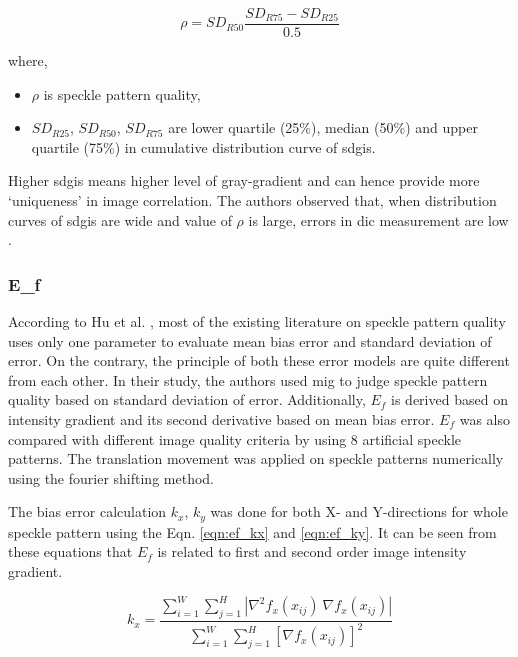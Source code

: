         \begin{equation}
            \rho = SD_{R50} \dfrac{SD_{R75} - SD_{R25}}{0.5}
        \end{equation}

        \noindent where,
        \begin{itemize}
            \item $\rho$ is speckle pattern quality,
            \item $SD_{R25}$, $SD_{R50}$, $SD_{R75}$ are lower quartile (25\%), median (50\%) and upper quartile (75\%) in cumulative distribution curve of \gls{sdgis}.
        \end{itemize}

        \noindent Higher \gls{sdgis} means higher level of gray-gradient and can hence provide more `uniqueness' in image correlation. The authors observed that, when distribution curves of \gls{sdgis} are wide and value of $\rho$ is large, errors in \gls{dic} measurement are low \cite{park_sdgis}. 

    \subsubsection{E\textbf{_f}}
        According to Hu et al. \cite{hu_ef}, most of the existing literature on speckle pattern quality uses only one parameter to evaluate mean bias error and standard deviation of error. On the contrary, the principle of both these error models are quite different from each other. In their study, the authors used \gls{mig} to judge speckle pattern quality based on standard deviation of error. Additionally, $E_f$ is derived based on intensity gradient and its second derivative based on mean bias error. $E_f$ was also compared with different image quality criteria by using 8 artificial speckle patterns. The translation movement was applied on speckle patterns numerically using the fourier shifting method. 

        \vspace{5mm}
        \noindent The bias error calculation $k_x$, $k_y$ was done for both X- and Y-directions for whole speckle pattern using the Eqn. \ref{eqn:ef_kx} and \ref{eqn:ef_ky}. It can be seen from these equations that $E_f$ is related to first and second order image intensity gradient. 
        
        \begin{equation}
            k_x = \dfrac{ \sum_{i=1}^{W} \sum_{j=1}^{H} |\nabla^2 f_x (x_{ij}) \ \nabla f_x (x_{ij}) | }{ \sum_{i=1}^{W} \sum_{j=1}^{H} [\nabla f_x (x_{ij})]^2 }
            \label{eqn:ef_kx}
        \end{equation}
        
